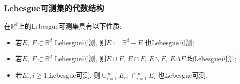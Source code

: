 \documentclass[Prob-All.tex]{subfiles}
\begin{document}
\begin{frame}
	\frametitle{{\rm Lebesgue}可测集的代数结构}


\begin{prop}
  在$\mathbb{R}^d$上的Lebesgue可测集具有以下性质:
  \begin{itemize}[<+-|alert@+>]
	\item 若$E,\  F\subset\mathbb{R}^d$ {\rm Lebesgue}可测, 则$\overline{E}:=\mathbb{R}^d-E$ 也{\rm Lebesgue}可测;
	\item 若$E,\  F\subset\mathbb{R}^d$ {\rm Lebesgue}可测, 则$E\cup F,\  E\cap F,\  E\backslash F,\  E\Delta F$ 均{\rm Lebesgue}可测;
	\item 若$E_i, i\geq 1$,{\rm Lebesgue}可测, 则$\cup_{i=1}^\infty E_i, \  \cap_{i=1}^\infty E_i$ 也{\rm Lebesgue}可测.
\end{itemize}
\end{prop}


\end{frame}
\end{document}
